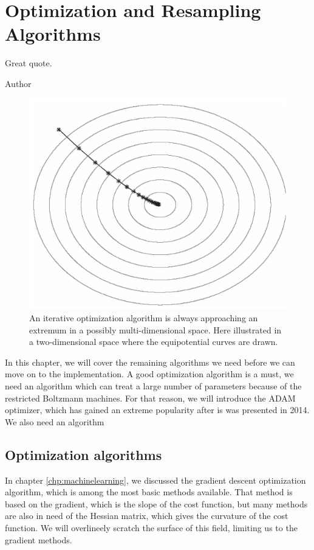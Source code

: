 \chapter{Optimization and Resampling Algorithms} \label{chp:optimization}
\epigraph{Great quote.}{Author}
\begin{figure}[H]
	\centering
	\includegraphics[scale=0.5]{Images/gd_bw.png}
	\caption{An iterative optimization algorithm is always approaching an extremum in a possibly multi-dimensional space. Here illustrated in a two-dimensional space where the equipotential curves are drawn.}
\end{figure}

In this chapter, we will cover the remaining algorithms we need before we can move on to the implementation. A good optimization algorithm is a must, we need an algorithm which can treat a large number of parameters because of the restricted Boltzmann machines. For that reason, we will introduce the ADAM optimizer, which has gained an extreme popularity after is was presented in 2014.  We also need an algorithm 

\newpage
\section{Optimization algorithms}
In chapter \ref{chp:machinelearning}, we discussed the gradient descent optimization algorithm, which is among the most basic methods available. That method is based on the gradient, which is the slope of the cost function, but many methods are also in need of the Hessian matrix, which gives the curvature of the cost function. We will overlineely scratch the surface of this field, limiting us to the gradient methods. 

